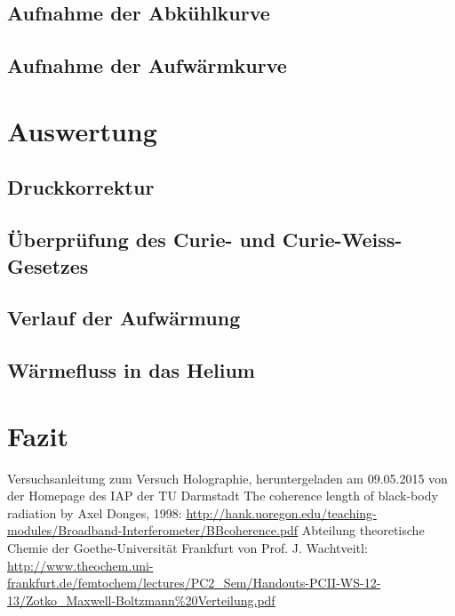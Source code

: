 \documentclass[bigchapter,colorback,accentcolor=tud4b,linedtoc,11pt]{tudreport}
\begin{document}
\section{Aufnahme der Abkühlkurve}

\section{Aufnahme der Aufwärmkurve}

\chapter{Auswertung}

\section{Druckkorrektur}

\section{Überprüfung des Curie- und Curie-Weiss-Gesetzes}

\section{Verlauf der Aufwärmung}

\section{Wärmefluss in das Helium}

\chapter{Fazit}

\cleardoublepage{}
\newpage
\begin{thebibliography}{100}
   Versuchsanleitung zum Versuch Holographie, heruntergeladen am 09.05.2015 von der Homepage des IAP der TU Darmstadt
   The coherence length of black-body
radiation by Axel Donges, 1998: \url{http://hank.uoregon.edu/teaching-modules/Broadband-Interferometer/BBcoherence.pdf}
   Abteilung theoretische Chemie der Goethe-Universität
    Frankfurt von Prof. J. Wachtveitl: \url{http://www.theochem.uni-frankfurt.de/femtochem/lectures/PC2_Sem/Handouts-PCII-WS-12-13/Zotko_Maxwell-Boltzmann%20Verteilung.pdf}
\end{thebibliography}
\end{document}
